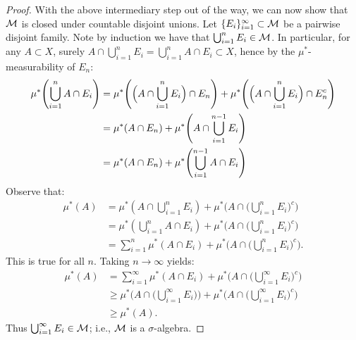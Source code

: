 \begin{proof}
            With the above intermediary step out of the way, we can now show that $\mathcal{M}$ is closed under countable disjoint unions. Let $\{E_i\}_{i = 1}^\infty \subset \mathcal{M}$ be a pairwise disjoint family. Note by induction we have that $\bigcup_{i = 1}^n E_i \in \mathcal{M}$. In particular, for any $A \subset X$, surely $A \cap \bigcup_{i = 1}^n E_i  = \bigcup_{i = 1}^n A \cap E_i \subset X$, hence by the $\mu^\ast$-measurability of $E_n$:
                \begin{equation*}
                \begin{split}
                    \mu^\ast \Biggl( \bigcup_{i = 1}^n A \cap E_i \Biggr) 
                    & = \mu^\ast \Biggl( \Bigl(A \cap \bigcup_{i = 1}^n E_i\Bigr) \cap E_n \Biggr) + \mu^\ast \Biggl( \Bigl(A \cap \bigcup_{i = 1}^n E_i\Bigr) \cap E_n^c \Biggr) \\
                    & = \mu^\ast(A \cap E_n) + \mu^\ast \Biggl(A \cap \bigcup_{i = 1}^{n-1}E_i\Biggr) \\
                    & = \mu^\ast(A \cap E_n) + \mu^\ast \Biggl(\bigcup_{i = 1}^{n-1} A \cap E_i\Biggr)
                \end{split}
                \end{equation*}
            Observe that:
                \begin{equation*}
                \begin{split}
                    \mu^\ast(A) 
                    & = \mu^\ast \left( A \cap \bigcup_{i = 1}^n E_i  \right) + \mu^\ast\Biggl( A \cap \Biggl(\bigcup_{i = 1}^n E_i\Biggr)^c\Biggr) \\
                    & = \mu^\ast \left( \bigcup_{i = 1}^n A \cap E_i  \right) + \mu^\ast\Biggl( A \cap \Biggl(\bigcup_{i = 1}^n E_i\Biggr)^c\Biggr) \\
                    & = \sum_{i = 1}^n \mu^\ast( A \cap E_i)   + \mu^\ast\Biggl( A \cap \Biggl(\bigcup_{i = 1}^n E_i\Biggr)^c\Biggr).
                \end{split}
                \end{equation*}
            This is true for all $n$. Taking $n \rightarrow \infty$ yields:
                \begin{equation*}
                \begin{split}
                    \mu^\ast(A) 
                    & = \sum_{i = 1}^\infty \mu^\ast( A \cap E_i)   + \mu^\ast\Biggl( A \cap \Biggl(\bigcup_{i = 1}^\infty E_i\Biggr)^c\Biggr) \\
                    & \geq \mu^\ast \Biggl( A \cap \Biggl(\bigcup_{i = 1}^\infty E_i\Biggr)\Biggr) + \mu^\ast\Biggl( A \cap \Biggl(\bigcup_{i = 1}^\infty E_i\Biggr)^c\Biggr) \\
                    & \geq \mu^\ast(A).
                \end{split}
                \end{equation*}
            Thus $\bigcup_{i = 1}^\infty E_i \in \mathcal{M}$; i.e., $\mathcal{M}$ is a $\sigma$-algebra.
            
        \end{proof}


